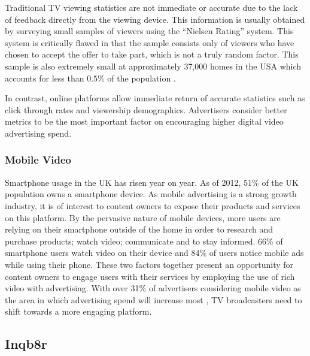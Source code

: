 	Traditional TV viewing statistics are not immediate or accurate due to the lack of feedback directly from the viewing device. This information is usually obtained by surveying small samples of viewers using the ``Nielsen Rating'' system. This system is critically flawed in that the sample consists only of viewers who have chosen to accept the offer to take part, which is not a truly random factor. This sample is also extremely small at approximately 37,000 homes in the USA which accounts for less than 0.5\% of the population \citep{nielsen-sample}.

	In contrast, online platforms allow immediate return of accurate statistics such as click through rates and viewership demographics. Advertisers consider better metrics to be the most important factor on encouraging higher digital video advertising spend.

	\subsubsection{Mobile Video}

	Smartphone usage in the UK has risen year on year. As of 2012, 51\% of the UK population owns a smartphone device. As mobile advertising is a strong growth industry, it is of interest to content owners to expose their products and services on this platform. By the pervasive nature of mobile devices, more users are relying on their smartphone outside of the home in order to research and purchase products; watch video; communicate and to stay informed. 66\% of smartphone users watch video on their device and 84\% of users notice mobile ads while using their phone. \citep{mobile-planet} These two factors together present an opportunity for content owners to engage users with their services by employing the use of rich video with advertising. With over 31\% of advertisers considering mobile video as the area in which advertising spend will increase most \citep{brightroll-report}, TV broadcasters need to shift towards a more engaging platform.




	\subsection{Inqb8r}

